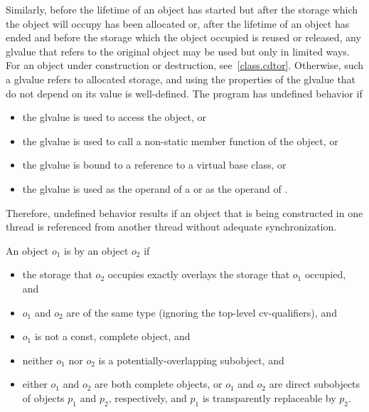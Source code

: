 \pnum
Similarly, before the lifetime of an object has started but after the
storage which the object will occupy has been allocated or, after the
lifetime of an object has ended and before the storage which the object
occupied is reused or released, any glvalue that refers to the original
object may be used but only in limited ways.
For an object under construction or destruction, see~\ref{class.cdtor}.
Otherwise, such
a glvalue refers to
allocated storage, and using the
properties of the glvalue that do not depend on its value is
well-defined. The program has undefined behavior if
\begin{itemize}
\item the glvalue is used to access the object, or
\item the glvalue is used to call a non-static member function of the object, or
\item the glvalue is bound to a reference to a virtual base class, or
\item the glvalue is used as the operand of a
 or as the operand of
.
\end{itemize}

\begin{note}
Therefore, undefined behavior results
if an object that is being constructed in one thread is referenced from another
thread without adequate synchronization.
\end{note}

\pnum
An object $o_1$ is  by an object $o_2$ if
\begin{itemize}
\item the storage that $o_2$ occupies exactly overlays
the storage that $o_1$ occupied, and

\item $o_1$ and $o_2$ are of the same type
(ignoring the top-level cv-qualifiers), and

\item $o_1$ is not a const, complete object, and

\item neither $o_1$ nor $o_2$
is a potentially-overlapping subobject, and

\item either $o_1$ and $o_2$ are both complete objects, or
$o_1$ and $o_2$ are direct subobjects of objects $p_1$ and $p_2$, respectively,
and $p_1$ is transparently replaceable by $p_2$.
\end{itemize}

